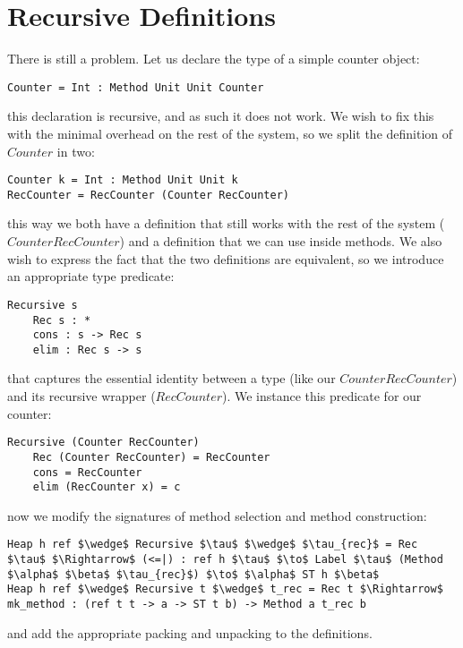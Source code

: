 \documentclass[a4paper]{article}
\begin{document}
\section{Recursive Definitions}

There is still a problem. Let us declare the type of a simple counter object:

\begin{lstlisting}
Counter = Int : Method Unit Unit Counter
\end{lstlisting}

this declaration is recursive, and as such it does not work. We wish to fix this with the minimal overhead on the rest of the system, so we split the definition of $Counter$ in two:

\begin{lstlisting}
Counter k = Int : Method Unit Unit k
RecCounter = RecCounter (Counter RecCounter)
\end{lstlisting}

this way we both have a definition that still works with the rest of the system ($Counter RecCounter$) and a definition that we can use inside methods. We also wish to express the fact that the two definitions are equivalent, so we introduce an appropriate type predicate:

\begin{lstlisting}
Recursive s
    Rec s : *
    cons : s -> Rec s
    elim : Rec s -> s
\end{lstlisting}

that captures the essential identity between a type (like our $Counter RecCounter$) and its recursive wrapper ($RecCounter$). We instance this predicate for our counter:

\begin{lstlisting}
Recursive (Counter RecCounter)
    Rec (Counter RecCounter) = RecCounter
    cons = RecCounter
    elim (RecCounter x) = c
\end{lstlisting}

now we modify the signatures of method selection and method construction:

\begin{lstlisting}
Heap h ref $\wedge$ Recursive $\tau$ $\wedge$ $\tau_{rec}$ = Rec $\tau$ $\Rightarrow$ (<=|) : ref h $\tau$ $\to$ Label $\tau$ (Method $\alpha$ $\beta$ $\tau_{rec}$) $\to$ $\alpha$ ST h $\beta$
Heap h ref $\wedge$ Recursive t $\wedge$ t_rec = Rec t $\Rightarrow$ mk_method : (ref t t -> a -> ST t b) -> Method a t_rec b
\end{lstlisting}

and add the appropriate packing and unpacking to the definitions.
\end{document}
